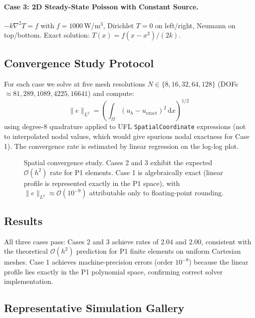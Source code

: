 \documentclass[twocolumn]{article}
\begin{document}
\paragraph{Case 3: 2D Steady-State Poisson with Constant Source.}
$-k\nabla^2 T = f$ with $f = 1000$\,W/m$^3$, Dirichlet $T=0$ on left/right,
Neumann on top/bottom.  Exact solution: $T(x) = f(x - x^2)/(2k)$.

\subsection{Convergence Study Protocol}

For each case we solve at five mesh resolutions $N \in \{8, 16, 32, 64, 128\}$
(DOFs $\approx 81, 289, 1089, 4225, 16641$) and compute:
\begin{equation}
  \|e\|_{L^2} = \left(\int_\Omega (u_h - u_{\text{exact}})^2\,\mathrm{d}x\right)^{1/2}
\end{equation}
using degree-8 quadrature applied to UFL \texttt{SpatialCoordinate}
expressions (not to interpolated nodal values, which would give spurious
nodal exactness for Case 1).  The convergence rate is estimated by
linear regression on the log-log plot.

\begin{figure}[htbp]
  \centering
  
  \caption{Spatial convergence study.  Cases 2 and 3 exhibit the expected
    $\mathcal{O}(h^2)$ rate for P1 elements.  Case 1 is algebraically exact
    (linear profile is represented exactly in the P1 space), with
    $\|e\|_{L^2} \approx \mathcal{O}(10^{-9})$ attributable only to
    floating-point rounding.}
  \label{fig:convergence}
\end{figure}

\subsection{Results}



All three cases pass: Cases 2 and 3 achieve rates of $2.04$ and $2.00$,
consistent with the theoretical $\mathcal{O}(h^2)$ prediction for P1
finite elements on uniform Cartesian meshes.  Case 1 achieves machine-precision
errors (order $10^{-9}$) because the linear profile lies exactly in the P1
polynomial space, confirming correct solver implementation.

\subsection{Representative Simulation Gallery}
\label{sec:gallery}
\end{document}
